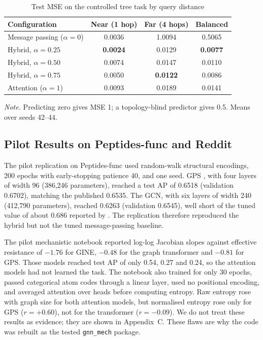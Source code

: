 \begin{table}[htbp]
\caption{Test MSE on the controlled tree task by query distance}
\label{tab:tree}
\centering\small
\begin{tabular}{@{}lccc@{}}
\toprule
Configuration & Near (1 hop) & Far (4 hops) & Balanced \\
\midrule
Message passing ($\alpha=0$) & 0.0036 & 1.0094 & 0.5065 \\
Hybrid, $\alpha=0.25$ & \textbf{0.0024} & 0.0129 & \textbf{0.0077} \\
Hybrid, $\alpha=0.50$ & 0.0074 & 0.0147 & 0.0110 \\
Hybrid, $\alpha=0.75$ & 0.0050 & \textbf{0.0122} & 0.0086 \\
Attention ($\alpha=1$) & 0.0093 & 0.0189 & 0.0141 \\
\bottomrule
\end{tabular}

\vspace{4pt}
\parbox{0.8\textwidth}{\footnotesize\textit{Note.} Predicting zero gives MSE 1; a topology-blind predictor gives 0.5. Means over seeds 42--44.}
\end{table}

\subsection{Pilot Results on Peptides-func and Reddit}
The pilot replication on Peptides-func \citep{dwivedi2022} used random-walk structural encodings, 200 epochs with early-stopping patience 40, and one seed. GPS \citep{rampasek2022}, with four layers of width 96 (386,246 parameters), reached a test AP of 0.6518 (validation 0.6702), matching the published 0.6535. The GCN, with six layers of width 240 (412,790 parameters), reached 0.6263 (validation 0.6545), well short of the tuned value of about 0.686 reported by \citet{tonshoff2024}. The replication therefore reproduced the hybrid but not the tuned message-passing baseline.

The pilot mechanistic notebook reported log-log Jacobian slopes against effective resistance of $-1.76$ for GINE, $-0.48$ for the graph transformer and $-0.81$ for GPS. Those models reached test AP of only 0.54, 0.27 and 0.24, so the attention models had not learned the task. The notebook also trained for only 30 epochs, passed categorical atom codes through a linear layer, used no positional encoding, and averaged attention over heads before computing entropy. Raw entropy rose with graph size for both attention models, but normalised entropy rose only for GPS ($r=+0.60$), not for the transformer ($r=-0.09$). We do not treat these results as evidence; they are shown in Appendix~C. These flaws are why the code was rebuilt as the tested \texttt{gnn\_mech} package.

